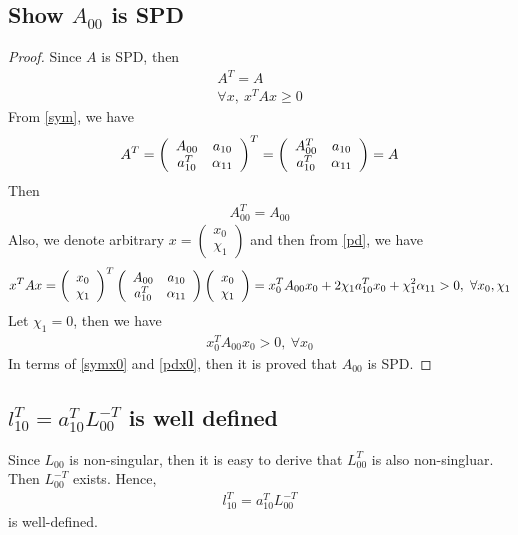 \documentclass[11pt,a4paper]{article}
\begin{document}
\subsection{Show $A_{00}$ is SPD}
\begin{proof}
    Since $A$ is SPD, then
    \begin{align}
        A^T = A \label{sym} \\
        \forall x,\ x^T A x \geq 0 \label{pd}
    \end{align}
    From \eqref{sym}, we have
    \begin{align}
        A^T = \left( \begin{array}{cc} A_{00} & a_{10} \\ a_{10}^T & \alpha_{11} \end{array} \right)^T = \left( \begin{array}{cc} A_{00}^T & a_{10} \\ a_{10}^T & \alpha_{11} \end{array} \right) = A
    \end{align}
    Then 
    \begin{align} \label{symx0}
        A_{00}^T = A_{00} \tag{symmetry of A}
    \end{align}
    Also, we denote arbitrary $x = \left( \begin{array}{c}
            x_{0}  \\ \chi_{1} 
        \end{array} \right)$ and then from \eqref{pd}, we have
    \begin{align}
        x^T A x = \left( \begin{array}{c} x_{0} \\ \chi_{1} \end{array} \right)^T \left( \begin{array}{cc} A_{00} & a_{10} \\ a_{10}^T & \alpha_{11} \end{array} \right) \left( \begin{array}{c} x_{0} \\ \chi_{1} \end{array} \right) =  x_0^T A_{00} x_0 + 2\chi_1 a_{10}^T
        x_0 + \chi_1^2 \alpha_{11}  > 0,\ \forall x_0, \chi_1
    \end{align}
    Let $\chi_1 = 0$, then we have
    \begin{align} \label{pdx0}
        x_0^T A_{00} x_0  > 0,\ \forall x_0 \tag{positive definiteness}
    \end{align}
    In terms of \eqref{symx0} and \eqref{pdx0}, then it is proved that
    $A_{00}$ is SPD.
\end{proof}
\subsection{$l_{10}^T = a_{10}^T L_{00}^{-T}$ is well defined}
Since $L_{00}$ is non-singular, then it is easy to derive that $L_{00}^T$ is also non-singluar.
Then $L_{00}^{-T}$ exists. Hence,
\begin{align}
    l_{10}^T = a_{10}^T L_{00}^{-T}
\end{align}
is well-defined. 
\end{document}
